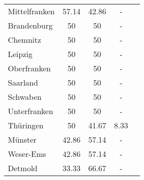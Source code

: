 \begin{table}[H]
\begin{tabularx}{\textwidth}{Xcccc}
            Mittelfranken & 57.14 & 42.86 & - \\
            Brandenburg & 50 & 50 & - \\
            Chemnitz & 50 & 50 & - \\
            Leipzig & 50 & 50 & - \\
            Oberfranken & 50 & 50 & - \\
            Saarland & 50 & 50 & - \\
            Schwaben & 50 & 50 & - \\
            Unterfranken & 50 & 50 & - \\
            Thüringen & 50 & 41.67 & 8.33 \\
            Münster & 42.86 & 57.14 & - \\
            Weser-Ems & 42.86 & 57.14 & - \\
            Detmold & 33.33 & 66.67 & - \\
        \bottomrule
    \end{tabularx}
\end{table}
    